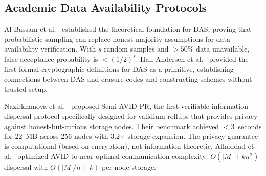 \begin{table}[!t]
\centering
\caption{Production Data Availability Systems: Architecture and Privacy Comparison}
\label{tab:production}
\end{table}

\subsection{Academic Data Availability Protocols}

Al-Bassam et al.~\cite{albassam2018fraud} established the theoretical
foundation for DAS, proving that probabilistic sampling can replace
honest-majority assumptions for data availability verification. With $s$
random samples and $>50\%$ data unavailable, false acceptance probability
is $<(1/2)^s$. Hall-Andersen et al.~\cite{hallandersen2024foundations}
provided the first formal cryptographic definitions for DAS as a primitive,
establishing connections between DAS and erasure codes and constructing
schemes without trusted setup.

Nazirkhanova et al.~\cite{nazirkhanova2022semiavidpr} proposed Semi-AVID-PR,
the first verifiable information dispersal protocol specifically designed for
validium rollups that provides privacy against honest-but-curious storage
nodes. Their benchmark achieved $<$3~seconds for 22~MB across 256 nodes with
3.2$\times$ storage expansion. The privacy guarantee is computational (based
on encryption), not information-theoretic. Alhaddad et
al.~\cite{alhaddad2022avid} optimized AVID to near-optimal communication
complexity: $O(|M| + kn^2)$ dispersal with $O(|M|/n + k)$ per-node storage.

